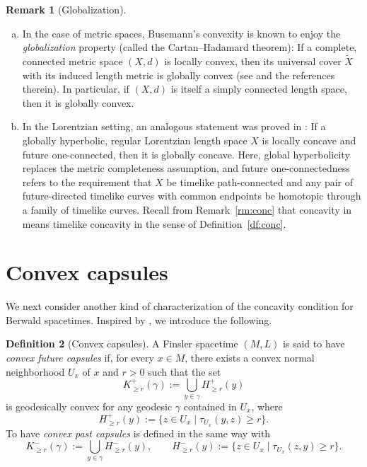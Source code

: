 \documentclass[a4paper,11pt]{article}
\numberwithin{equation}{section}
\theoremstyle{definition}
\newtheorem{definition}{Definition}[section]
\newtheorem{remark}[definition]{Remark}
\theoremstyle{plain}
\begin{document}
\begin{remark}[Globalization]
\label{rm:global}
\begin{enumerate}[(a)]
\item
In the case of metric spaces, Busemann's convexity is known to enjoy the \emph{globalization} property (called the Cartan--Hadamard theorem):
If a complete, connected metric space $(X,d)$ is locally convex, then its universal cover $\widetilde{X}$ with its induced length metric is globally convex
(see \cite[Theorem~II.4.1(1)]{BH} and the references therein).
In particular, if $(X,d)$ is itself a simply connected length space, then it is globally convex.

\item
In the Lorentzian setting, an analogous statement was proved in \cite[Theorem~4.9]{EG}:
If a globally hyperbolic, regular Lorentzian length space $X$ is locally concave and future one-connected, then it is globally concave. Here, global hyperbolicity replaces the metric completeness assumption, and future one-connectedness refers to the requirement that $X$ be timelike path-connected and any pair of future-directed timelike curves with common endpoints be homotopic through a family of timelike curves.
Recall from Remark~\ref{rm:conc} that concavity in \cite{EG} means timelike concavity in the sense of Definition~\ref{df:conc}.
\end{enumerate}
\end{remark}


\section{Convex capsules}\label{sc:capsule}%

We next consider another kind of characterization of the concavity condition for Berwald spacetimes.
Inspired by \cite{KK}, we introduce the following.

\begin{definition}[Convex capsules]\label{df:capsule}
A Finsler spacetime $(M,L)$ is said to have \emph{convex future capsules} if, for every $x \in M$, there exists a convex normal neighborhood $U_x$ of $x$ and $r>0$ such that the set
\[ K_{\geq r}^+(\gamma) :=\bigcup_{y \in \gamma} H_{\geq r}^+(y) \]
is geodesically convex for any geodesic $\gamma$ contained in $U_x$, where
\[ H_{\geq r}^+(y):=\{z \in U_x \mid \tau_{U_x}(y,z) \geq r\}. \]
To have \emph{convex past capsules} is defined in the same way with
\[ K_{\geq r}^-(\gamma) :=\bigcup_{y \in \gamma} H_{\geq r}^-(y), \qquad
H_{\geq r}^-(y):=\{z \in U_x \mid \tau_{U_x}(z,y) \geq r\}. \]
\end{definition}
\end{document}
